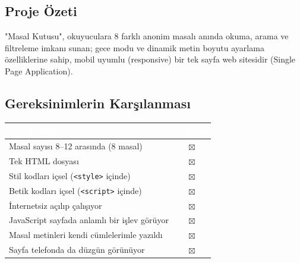 \documentclass[12pt,a4paper]{article}
\begin{document}
\subsection{Proje Özeti}
"Masal Kutusu", okuyuculara 8 farklı anonim masalı anında okuma, arama ve filtreleme imkanı sunan; gece modu ve dinamik metin boyutu ayarlama özelliklerine sahip, mobil uyumlu (responsive) bir tek sayfa web sitesidir (Single Page Application).

\subsection{Gereksinimlerin Karşılanması}
\begin{center}
\begin{tabular}{@{}p{8.2cm}c@{}}
\toprule
\rowcolor{ana}\textcolor{white}{\textbf{Gereksinim}} & \textcolor{white}{\textbf{Durum}} \\
\midrule
Masal sayısı 8--12 arasında (8 masal)         & $\boxtimes$ \\
Tek HTML dosyası                                    & $\boxtimes$ \\
Stil kodları içsel (\texttt{<style>} içinde)        & $\boxtimes$ \\
Betik kodları içsel (\texttt{<script>} içinde)      & $\boxtimes$ \\
İnternetsiz açılıp çalışıyor                        & $\boxtimes$ \\
JavaScript sayfada anlamlı bir işlev görüyor        & $\boxtimes$ \\
Masal metinleri kendi cümlelerimle yazıldı          & $\boxtimes$ \\
Sayfa telefonda da düzgün görünüyor                 & $\boxtimes$ \\
\bottomrule
\end{tabular}
\end{center}

\end{document}
